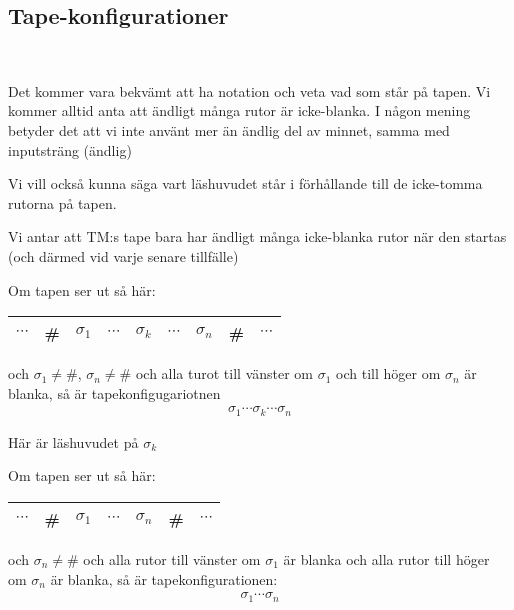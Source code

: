 \subsection{Tape-konfigurationer}\hfill\\\par
\noindent Det kommer vara bekvämt att ha notation och veta vad som står på tapen. Vi kommer alltid anta att ändligt många rutor är icke-blanka. I någon mening betyder det att vi inte använt mer än ändlig del av minnet, samma med inputsträng (ändlig)
\par\bigskip
\noindent Vi vill också kunna säga vart läshuvudet står i förhållande till de icke-tomma rutorna på tapen.
\par\bigskip
\noindent Vi antar att TM:s tape bara har ändligt många icke-blanka rutor när den startas (och därmed vid varje senare tillfälle)
\par\bigskip
\noindent Om tapen ser ut så här:
\begin{center}
  \begin{tabular}{c|c|c|c|c|c|c|c|c}
    \hline
    $\cdots$&\#&$\sigma_1$&$\cdots$&$\sigma_k$&$\cdots$&$\sigma_n$&\#&$\cdots$\\
    \hline
  \end{tabular}
\end{center}\par
\noindent och $\sigma_1\neq\#$, $\sigma_n\neq\#$ och alla turot till vänster om $\sigma_1$ och till höger om $\sigma_n$ är blanka, så är tapekonfigugariotnen
\begin{equation*}
  \begin{gathered}
    \sigma_1\cdots\sigma_k\cdots\sigma_n
  \end{gathered}
\end{equation*}\par
\noindent Här är läshuvudet på $\sigma_k$
\par\bigskip
\noindent Om tapen ser ut så här:
\begin{center}
  \begin{tabular}{c|c|c|c|c|c|c}
    \hline
    $\cdots$&\#&$\sigma_1$&$\cdots$&$\sigma_n$&\#&$\cdots$\\
    \hline
  \end{tabular}
\end{center}\par
\noindent och $\sigma_n\neq\#$ och alla rutor till vänster om $\sigma_1$ är blanka och alla rutor till höger om $\sigma_n$ är blanka, så är tapekonfigurationen:
\begin{equation*}
  \begin{gathered}
    \sigma_1\cdots\sigma_n
  \end{gathered}
\end{equation*}\par
